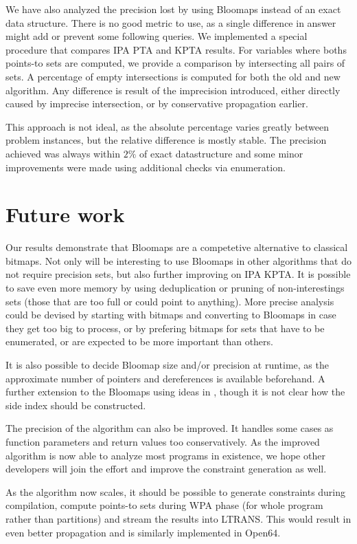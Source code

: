 We have also analyzed the precision lost by using Bloomaps instead of an exact
data structure. There is no good metric to use, as a single difference in
answer might add or prevent some following queries. We implemented a special
procedure that compares IPA PTA and KPTA results. For variables where boths
points-to sets are computed, we provide a comparison by intersecting all pairs
of sets. A percentage of empty intersections is computed for both the old and
new algorithm. Any difference is result of the imprecision introduced, either
directly caused by imprecise intersection, or by conservative propagation
earlier.

This approach is not ideal, as the absolute percentage varies greatly between
problem instances, but the relative difference is mostly stable. The precision
achieved was always within $2\%$ of exact datastructure and some minor
improvements were made using additional checks via enumeration.

\section{Future work}

Our results demonstrate that Bloomaps are a competetive alternative
to classical bitmaps. Not only will be interesting to use Bloomaps in other
algorithms that do not require precision sets, but also further improving on IPA
KPTA. It is possible to save even more memory by using deduplication or pruning
of non-interestings sets (those that are too full or could point to anything).
More precise analysis could be devised by starting with bitmaps and converting
to Bloomaps in case they get too big to process, or by prefering bitmaps for
sets that have to be enumerated, or are expected to be more important than others.

It is also possible to decide Bloomap size and/or precision at runtime, as the
approximate number of pointers and dereferences is available beforehand. A
further extension to the Bloomaps using ideas in \cite{Guo06thedynamic}, though it
is not clear how the side index should be constructed.

The precision of the algorithm can also be improved. It handles some cases
as function parameters and return values too conservatively. As the improved
algorithm is now able to analyze most programs in existence, we hope other
developers will join the effort and improve the constraint generation as well.

As the algorithm now scales, it should be possible to generate constraints
during compilation, compute points-to sets during WPA phase (for whole program
rather than partitions) and stream the results into LTRANS. This would result
in even better propagation and is similarly implemented in Open64.
